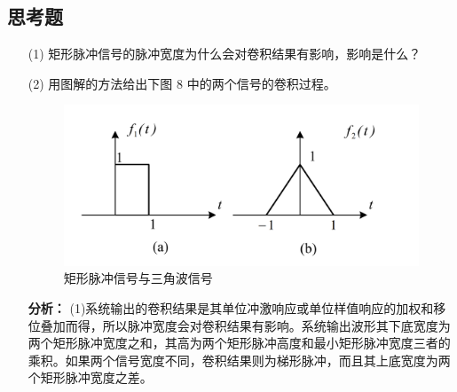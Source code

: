 \documentclass[UTF8,AutoFakeBold]{ctexart}
\begin{document}
	\subsection{{\heiti{}思考题}}
	\begin{enumerate}
		\item[(1)] 矩形脉冲信号的脉冲宽度为什么会对卷积结果有影响，影响是什么？
		\item[(2)] 用图解的方法给出下图 8 中的两个信号的卷积过程。
		\begin{figure}[H]
			\centering
			\includegraphics[scale=0.4]{./figures/photo8.png}
			\caption{矩形脉冲信号与三角波信号}
		\end{figure}
		\textbf{\songti 分析：} (1)系统输出的卷积结果是其单位冲激响应或单位样值响应的加权和移位叠加而得，所以脉冲宽度会对卷积结果有影响。系统输出波形其下底宽度为两个矩形脉冲宽度之和，其高为两个矩形脉冲高度和最小矩形脉冲宽度三者的乘积。如果两个信号宽度不同，卷积结果则为梯形脉冲，而且其上底宽度为两个矩形脉冲宽度之差。\par



\end{enumerate}
\end{document}
